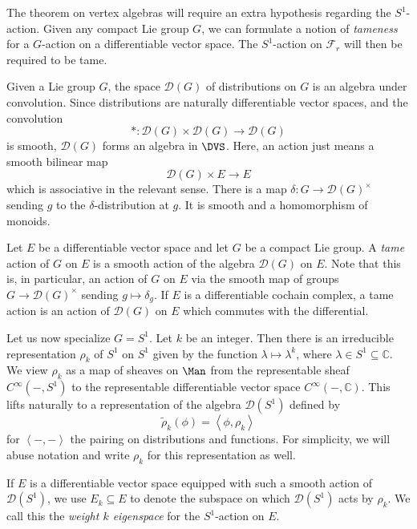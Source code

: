 The theorem on vertex algebras will require an extra hypothesis regarding the $S^1$-action. Given any compact Lie group $G$, we can formulate a notion of \emph{tameness} for a $G$-action on a differentiable vector space. The $S^1$-action on $\mathcal{F} _r$ will then be required to be tame.

Given a Lie group $G$, the space $\mathcal{D} (G)$ of distributions on $G$ is an algebra under convolution. Since distributions are naturally differentiable vector spaces, and the convolution
\[
	*: \mathcal{D} (G) \times  \mathcal{D} (G) \to \mathcal{D} (G)
\]
is smooth, $\mathcal{D} (G)$ forms an algebra in $\DVS $. Here, an action just means a smooth bilinear map
\[
	\mathcal{D} (G)\times E \to E
\]
which is associative in the relevant sense. There is a map $\delta : G \to \mathcal{D} (G)^{\times }$ sending $g$ to the $\delta $-distribution at $g$. It is smooth and a homomorphism of monoids.

\begin{definition}\label{dfn:5-2-3}
	Let $E$ be a differentiable vector space and let $G$ be a compact Lie group. A \emph{tame} action of $G$ on $E$ is a smooth action of the algebra $\mathcal{D} (G)$ on $E$. Note that this is, in particular, an action of $G$ on $E$ via the smooth map of groups $G\to \mathcal{D} (G)^{\times } $ sending $g\mapsto \delta _g$. If $E$ is a differentiable cochain complex, a tame action is an action of $\mathcal{D} (G)$ on $E$ which commutes with the differential.
\end{definition}

Let us now specialize $G=S^1$. Let $k$ be an integer. Then there is an irreducible representation $\rho _k$ of $S^1$ on $S^1$ given by the function $\lambda \mapsto \lambda ^k$, where $\lambda \in S^1 \subseteq \mathbb{C} $. We view $\rho _k$ as a map of sheaves on $\Man $ from the representable sheaf $C^\infty (-,S^1)$ to the representable differentiable vector space $C^\infty(-,\mathbb{C} )$. This lifts naturally to a representation of the algebra $\mathcal{D} (S^1)$ defined by
\[
	\widetilde{\rho } _k(\phi ) = \left\langle \phi ,\rho _k \right\rangle 
\]
for $\left\langle -,- \right\rangle $ the pairing on distributions and functions. For simplicity, we will abuse notation and write $\rho _k$ for this representation as well.

If $E$ is a differentiable vector space equipped with such a smooth action of $\mathcal{D} (S^1)$, we use $E_k \subseteq E$ to denote the subspace on which $\mathcal{D} (S^1)$ acts by $\rho _k$. We call this the \emph{weight $k$ eigenspace} for the $S^1$-action on $E$.

